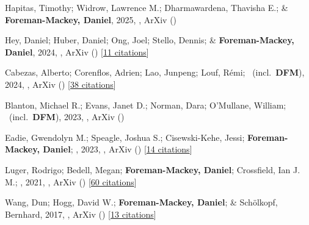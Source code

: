 \item[{\color{numcolor}\scriptsize10}] Hapitas, Timothy; Widrow, Lawrence M.; Dharmawardena, Thavisha E.; \& \textbf{Foreman-Mackey, Daniel}, 2025, , ArXiv ()

\item[{\color{numcolor}\scriptsize9}] Hey, Daniel; Huber, Daniel; Ong, Joel; Stello, Dennis; \& \textbf{Foreman-Mackey, Daniel}, 2024, , ArXiv () [\href{https://ui.adsabs.harvard.edu/abs/2024arXiv240302489H}{11 citations}]

\item[{\color{numcolor}\scriptsize8}] Cabezas, Alberto; Corenflos, Adrien; Lao, Junpeng; Louf, R{\'e}mi; \etal\ (incl.\ \textbf{DFM}), 2024, , ArXiv () [\href{https://ui.adsabs.harvard.edu/abs/2024arXiv240210797C}{38 citations}]

\item[{\color{numcolor}\scriptsize7}] Blanton, Michael R.; Evans, Janet D.; Norman, Dara; O'Mullane, William; \etal\ (incl.\ \textbf{DFM}), 2023, , ArXiv ()

\item[{\color{numcolor}\scriptsize6}] Eadie, Gwendolyn M.; Speagle, Joshua S.; Cisewski-Kehe, Jessi; \textbf{Foreman-Mackey, Daniel}; \etal, 2023, , ArXiv () [\href{https://ui.adsabs.harvard.edu/abs/2023arXiv230204703E}{14 citations}]

\item[{\color{numcolor}\scriptsize5}] Luger, Rodrigo; Bedell, Megan; \textbf{Foreman-Mackey, Daniel}; Crossfield, Ian J. M.; \etal, 2021, , ArXiv () [\href{https://ui.adsabs.harvard.edu/abs/2021arXiv211006271L}{60 citations}]

\item[{\color{numcolor}\scriptsize4}] Wang, Dun; Hogg, David W.; \textbf{Foreman-Mackey, Daniel}; \& Sch{\"o}lkopf, Bernhard, 2017, , ArXiv () [\href{https://ui.adsabs.harvard.edu/abs/2017arXiv171002428W}{13 citations}]

